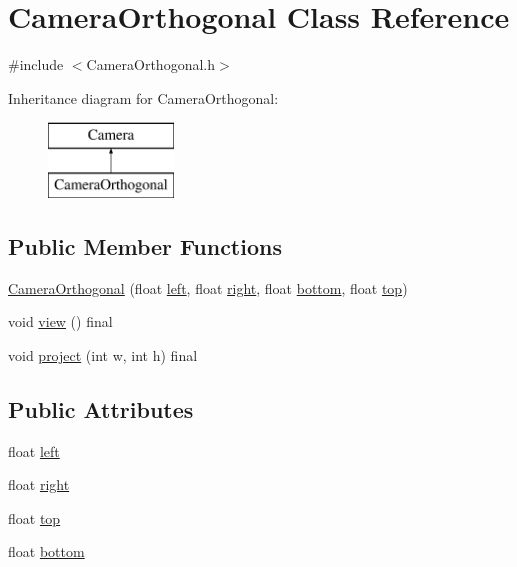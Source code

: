 \hypertarget{class_camera_orthogonal}{}\section{Camera\+Orthogonal Class Reference}
\label{class_camera_orthogonal}


{\ttfamily \#include $<$Camera\+Orthogonal.\+h$>$}

Inheritance diagram for Camera\+Orthogonal\+:\begin{figure}[H]
\begin{center}
\leavevmode
\includegraphics[height=2.000000cm]{class_camera_orthogonal}
\end{center}
\end{figure}
\subsection*{Public Member Functions}
\begin{DoxyCompactItemize}
\item 
\hyperlink{class_camera_orthogonal_aabed9106e5ae8c9661afba065f8cd6ad}{Camera\+Orthogonal} (float \hyperlink{class_camera_orthogonal_a8a6d6d01dae35b1ddb7de2e06f7a2133}{left}, float \hyperlink{class_camera_orthogonal_a7f25057c59bc911d92b99d7f649fe790}{right}, float \hyperlink{class_camera_orthogonal_a87037becad1484ffdc5cd9a051716d6e}{bottom}, float \hyperlink{class_camera_orthogonal_afb3bdd5249f1e5d690624812bac24dd7}{top})
\item 
void \hyperlink{class_camera_orthogonal_aba42e2f1ce347576e6ab83e45a8d7ed9}{view} () final
\item 
void \hyperlink{class_camera_orthogonal_a593df7d7b84de30d312e31ffed831d9c}{project} (int w, int h) final
\end{DoxyCompactItemize}
\subsection*{Public Attributes}
\begin{DoxyCompactItemize}
\item 
float \hyperlink{class_camera_orthogonal_a8a6d6d01dae35b1ddb7de2e06f7a2133}{left}
\item 
float \hyperlink{class_camera_orthogonal_a7f25057c59bc911d92b99d7f649fe790}{right}
\item 
float \hyperlink{class_camera_orthogonal_afb3bdd5249f1e5d690624812bac24dd7}{top}
\item 
float \hyperlink{class_camera_orthogonal_a87037becad1484ffdc5cd9a051716d6e}{bottom}
\end{DoxyCompactItemize}


